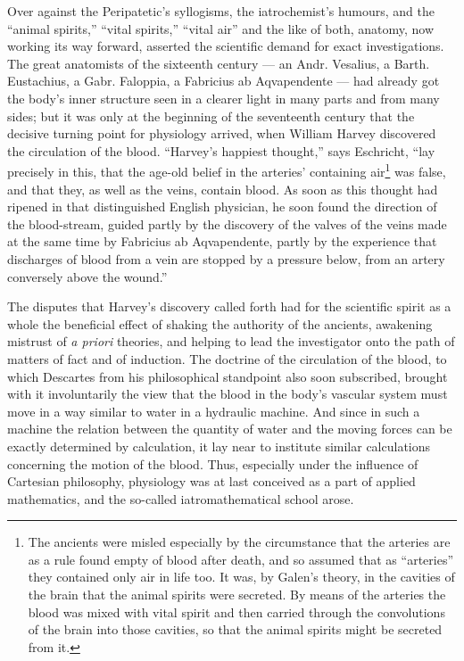 \documentclass[12pt,a4paper]{book}
\begin{document}
\setcounter{footnote}{0}
Over against the Peripatetic's syllogisms, the iatrochemist's humours, and the
``animal spirits,'' ``vital spirits,'' ``vital air'' and the like of both,
anatomy, now working its way forward, asserted the scientific demand for exact
investigations. The great anatomists of the sixteenth century --- an Andr.
Vesalius, a Barth. Eustachius, a Gabr. Faloppia, a Fabricius ab Aqvapendente
--- had already got the body's inner structure seen in a clearer light in many
parts and from many sides; but it was only at the beginning of the seventeenth
century that the decisive turning point for physiology arrived, when William
Harvey discovered the circulation of the blood. ``Harvey's happiest thought,''
says Eschricht, ``lay precisely in this, that the age-old belief in the
arteries' containing air\footnote{The ancients were misled especially by the
circumstance that the arteries are as a rule found empty of blood after death,
and so assumed that as ``arteries'' they contained only air in life too. It was,
by Galen's theory, in the cavities of the brain that the animal spirits were
secreted. By means of the arteries the blood was mixed with vital spirit and
then carried through the convolutions of the brain into those cavities, so that
the animal spirits might be secreted from it.} was false, and that they, as
well as
the veins, contain blood. As soon as this thought had ripened in that
distinguished English physician, he soon found the direction of the
blood-stream, guided partly by the discovery of the valves of the veins made at
the same time by Fabricius ab Aqvapendente, partly by the experience that
discharges of blood from a vein are stopped by a pressure below, from an artery
conversely above the wound.''

The disputes that Harvey's discovery called forth had for the scientific spirit
as a whole the beneficial effect of shaking the authority of the ancients,
awakening mistrust of \textit{a priori} theories, and helping to lead the
investigator onto the path of matters of fact and of induction. The doctrine of
the circulation of the blood, to which Descartes from his philosophical
standpoint also soon subscribed, brought with it involuntarily the view that
the blood in the body's vascular system must move in a way similar to water in
a hydraulic machine. And since in such a machine the relation between the
quantity of water and the moving forces can be exactly determined by
calculation, it lay near to institute similar calculations concerning the
motion of the blood. Thus, especially under the influence of Cartesian
philosophy, physiology was at last conceived as a part of applied mathematics,
and the so-called iatromathematical school arose.
\end{document}
